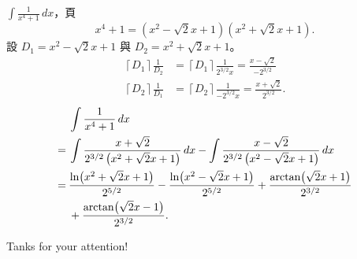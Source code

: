 \documentclass{beamer}
\newcommand{\Left} {\mathopen{}\mathclose\bgroup\left}
\newcommand{\Right}{\aftergroup\egroup\right}
\theoremstyle{remark}
\begin{document}
\begin{CJK}{UTF8}{bsmi}
\begin{frame}[allowframebreaks]{$\displaystyle \int \frac{1}{x^4 + 1}\,dx$，頁}
  \[x^4 + 1 = \left( x^2 - \sqrt2 x + 1 \right) \left( x^2 + \sqrt2 x + 1 \right).\]
  設 $D_1 = x^2 - \sqrt2 x + 1$ 與 $D_2 = x^2 + \sqrt2 x + 1$。
  \begin{align*}
    \left\lceil D_1 \right\rceil \frac{1}{D_2} &= \left\lceil D_1 \right\rceil \frac{1}{2^{3/2} x}
      = \frac{x - \sqrt2}{-2^{3/2}}\\
    \left\lceil D_2 \right\rceil \frac{1}{D_1} &= \left\lceil D_2 \right\rceil \frac{1}{-2^{3/2} x}
      = \frac{x + \sqrt2}{2^{3/2}}.
  \end{align*}
  \begin{align*}
       & \int \frac{1}{x^4 + 1}\,dx\\
    =\:& \int \frac{x + \sqrt2}{2^{3/2} \left( x^2 + \sqrt2 x + 1 \right)}\,dx
	 - \int \frac{x - \sqrt2}{2^{3/2} \left( x^2 - \sqrt2 x + 1 \right)}\,dx\\
    =\:& \frac{\ln \Left( x^2 + \sqrt2 x + 1 \Right)}{2^{5/2}} - \frac{\ln \Left( x^2 - \sqrt2 x + 1 \Right)}{2^{5/2}}
	 + \frac{\arctan \Left( \sqrt2 x + 1 \Right)}{2^{3/2}}\\
    \phantom=\:& +\frac{\arctan \Left( \sqrt2 x - 1 \Right)}{2^{3/2}}.
  \end{align*}
\end{frame}

\begin{frame}
  \begin{center}
    \huge Tanks for your attention!
  \end{center}
\end{frame}
\end{CJK}
\end{document}
